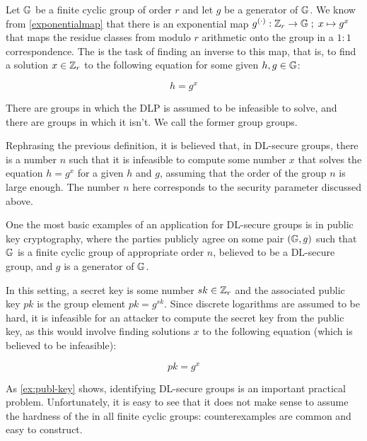 \begin{definition}[]
Let $\mathbb{G}$ be a finite cyclic group of order $r$ and let $g$ be a generator of $\mathbb{G}$. We know from \eqref{exponentialmap} that there is an exponential map $g^{(\cdot)}: \mathbb{Z}_r \to \mathbb{G}\; ;\; x\mapsto g^x$ that maps the residue classes from modulo $r$ arithmetic onto the group in a $1:1$ correspondence.
The \textbf{} is the task of finding an inverse to this map, that is, to find a solution $x\in\mathbb{Z}_r$ to the following equation for some given $h, g \in \mathbb{G}$:

\begin{equation}
h = g^x
\end{equation}
\end{definition}

There are groups in which the DLP is assumed to be infeasible to solve, and there are groups in which it isn't. We call the former group  groups.

Rephrasing the previous definition, it is believed that, in DL-secure groups, there is a number $n$  such that it is infeasible to compute some number $x$ that solves the equation $h=g^x$ for a given $h$ and $g$, assuming that the order of the group $n$ is large enough. The number $n$ here corresponds to the security parameter discussed above.

\begin{example}\label{ex:publ-key}

One the most basic examples of an application for DL-secure groups is in public key cryptography, where the parties publicly agree on some pair $(\mathbb{G},g)$  such that $\mathbb{G}$ is a finite cyclic group of appropriate order $n$, believed to be a DL-secure group, and $g$ is a generator of $\mathbb{G}$.

In this setting, a secret key is some number $sk \in \mathbb{Z}_r$ and the associated public key $pk$ is the group element $pk=g^{sk}$. Since discrete logarithms are assumed to be hard, it is infeasible for an attacker to compute the secret key from the public key, as this would involve finding solutions $x$ to the following equation (which is believed to be infeasible):

\begin{equation}
pk = g^{x}
\end{equation}

\end{example}

As \examplename{} \ref{ex:publ-key} shows, identifying DL-secure groups is an important practical problem. Unfortunately, it is easy to see that it does not make sense to assume the hardness of the  in all finite cyclic groups: counterexamples are common and easy to construct.

